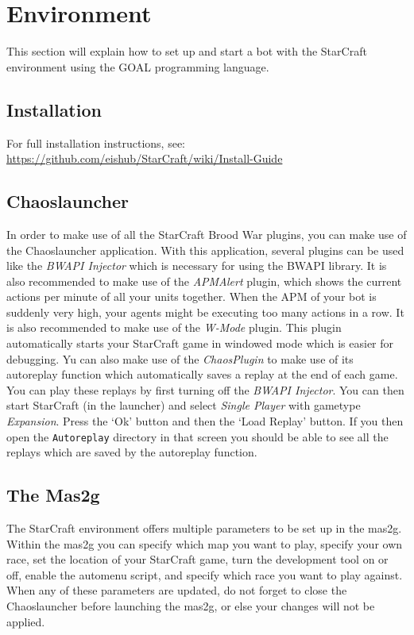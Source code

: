 \chapter{Environment}
This section will explain how to set up and start a bot with the StarCraft environment using the GOAL programming language.

\section{Installation}
For full installation instructions, see: \url{https://github.com/eishub/StarCraft/wiki/Install-Guide}

\section{Chaoslauncher}
In order to make use of all the StarCraft Brood War plugins, you can make use of the Chaoslauncher application. With this application, several plugins can be used like the \textit{BWAPI Injector} which is necessary for using the BWAPI library. It is also recommended to make use of the \textit{APMAlert} plugin, which shows the current actions per minute of all your units together. When the APM of your bot is suddenly very high, your agents might be executing too many actions in a row. It is also recommended to make use of the \textit{W-Mode} plugin. This plugin automatically starts your StarCraft game in windowed mode which is easier for debugging. Yu can also make use of the \textit{ChaosPlugin} to make use of its autoreplay function which automatically saves a replay at the end of each game. You can play these replays by first turning off the \textit{BWAPI Injector}. You can then start StarCraft (in the launcher) and select \textit{Single Player} with gametype \textit{Expansion}. Press the `Ok' button and then the `Load Replay' button. If you then open the
\texttt{Autoreplay} directory in that screen you should be able to see all the replays which are saved by the autoreplay function.

\section{The Mas2g}
\label{mas2g}
The StarCraft environment offers multiple parameters to be set up in the mas2g. Within the mas2g you can specify which map you want to play, specify your own race, set the location of your StarCraft game, turn the development tool on or off, enable the automenu script, and specify which race you want to play against. When any of these parameters are updated, do not forget to close the Chaoslauncher before launching the mas2g, or else your changes will not be applied.

